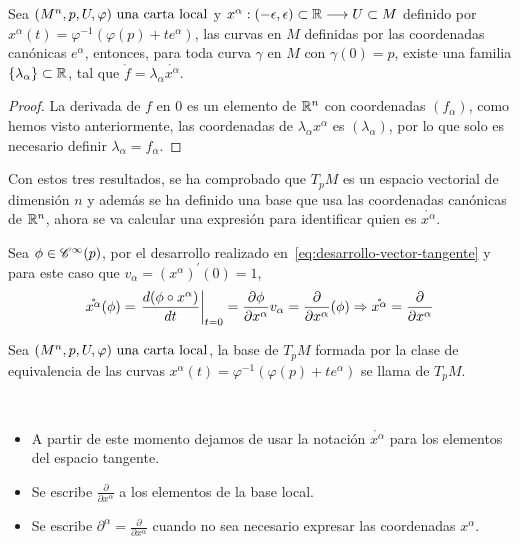 \begin{proposition}
  Sea $(M^n,p,U,\varphi)\textmd{ una carta local}$ y $
  x^\alpha:(-\epsilon, \epsilon)
  \subset\mathbb{R}\longrightarrow U\subset M$ definido por $x^\alpha(t)=\varphi^{-1}(\varphi(p)+te^\alpha)$, las curvas en
  $M$
  definidas por las coordenadas canónicas $e^\alpha$, entonces, para toda curva $\gamma$ en $M$ con
  $\gamma(0)=p$, existe una familia
  $\{\lambda_\alpha\}\subset\mathbb{R}$, tal que
  $\mathring{f}=\lambda_\alpha\mathring{x^\alpha}$.
\end{proposition}
\begin{proof}
  La derivada de $f$ en $0$ es un elemento de $\mathbb{R}^n$ con coordenadas $(f_\alpha)$, como hemos visto
  anteriormente, las coordenadas de $\lambda_\alpha x^\alpha$ es $(\lambda_\alpha)$, por lo que
  solo es necesario definir $\lambda_\alpha=f_\alpha$.
\end{proof}

Con estos tres resultados, se ha comprobado que $T_pM$ es un espacio vectorial de dimensión $n$
y además se ha definido una base que usa las coordenadas canónicas de $\mathbb{R}^n$, ahora se va calcular una expresión para
identificar quien es $\mathring{x^\alpha}$.

Sea $\phi\in\mathscr{C}^\infty(p)$, por el desarrollo realizado en~\ref{eq:desarrollo-vector-tangente} y para este caso
que $v_\alpha=(x^\alpha)^{'}(0)=1$,
\[
  \mathring{x^\alpha}(\phi)=\left.\frac{d(\phi\circ x^\alpha)
  }{dt}\right|_{t=0}=\frac{\partial\phi}{\partial x^\alpha}v_\alpha=\frac{\partial}{\partial x^\alpha}(\phi)
  \Rightarrow\mathring{x^\alpha}=\frac{\partial}{\partial x^\alpha}
\]
\begin{definition}
  Sea $(M^n,p,U,\varphi)\textmd{ una carta local}$, la base de $T_p M$ formada por la clase de equivalencia de las curvas
  $x^\alpha(t)=\varphi^{-1}(\varphi(p)+te^\alpha)$ se llama  de
  $T_p M$.
\end{definition}
\begin{notation}
  \
  \begin{itemize}
    \item A partir de este momento dejamos de usar la notación $\mathring{x^\alpha}$ para los elementos del espacio
    tangente.
    \item Se escribe $\frac{\partial}{\partial x^\alpha}$ a los elementos de la base local.
    \item Se escribe $\partial^\alpha=\frac{\partial}{\partial x^\alpha}$ cuando no sea necesario expresar las coordenadas
    $x^\alpha$.
  \end{itemize}

\end{notation}